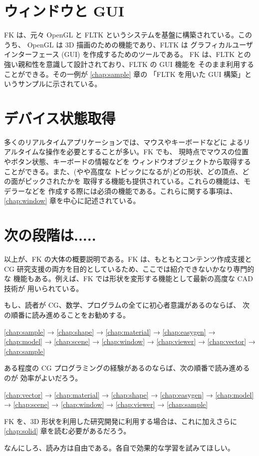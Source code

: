 \section{ウィンドウと GUI}
FK は、元々 OpenGL と FLTK というシステムを基盤に構築されている。このうち、
OpenGL は 3D 描画のための機能であり、FLTK は
グラフィカルユーザインターフェース (GUI) を作成するためのツールである。
FK は、FLTK との強い親和性を意識して設計されており、FLTK の GUI 機能を
そのまま利用することができる。その一例が \ref{chap:sample} 章の
「FLTK を用いた GUI 構築」というサンプルに示されている。

\section{デバイス状態取得}
多くのリアルタイムアプリケーションでは、マウスやキーボードなどに
よるリアルタイムな操作を必要とすることが多い。FK でも、
現時点でマウスの位置やボタン状態、キーボードの情報などを
ウィンドウオブジェクトから取得することができる。また、(やや高度な
トピックになるが)どの形状、どの頂点、どの面がピックされたかを
取得する機能も提供されている。これらの機能は、モデラーなどを
作成する際には必須の機能である。これらに関する事項は、
\ref{chap:window} 章を中心に記述されている。

\section{次の段階は.....}
以上が、FK の大体の概要説明である。FK は、もともとコンテンツ作成支援と
CG 研究支援の両方を目的としているため、ここでは紹介できないかなり専門的な
機能もある。例えば、FK では形状を変形する機能として最新の高度な CAD 技術が
用いられている。

もし、読者が CG、数学、プログラムの全てに初心者意識があるのならば、
次の順番に読み進めることをお勧めする。
\begin{center}
\ref{chap:sample} → \ref{chap:shape} → \ref{chap:material} →
\ref{chap:easygen} →
\ref{chap:model} → \ref{chap:scene} → \ref{chap:window} →
\ref{chap:viewer} → \ref{chap:vector} → \ref{chap:sample} 
\end{center}
ある程度の CG プログラミングの経験があるのならば、次の順番で読み進めるのが
効率がよいだろう。
\begin{center}
\ref{chap:vector} → \ref{chap:material} → \ref{chap:shape} →
\ref{chap:easygen} →
\ref{chap:model} → \ref{chap:scene} → \ref{chap:window} →
\ref{chap:viewer} → \ref{chap:sample}
\end{center}
FK を、3D 形状を利用した研究開発に利用する場合は、これに加えさらに
\ref{chap:solid} 章を読む必要があるだろう。

なんにしろ、読み方は自由である。各自で効果的な学習を試みてほしい。
